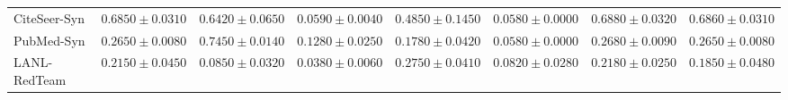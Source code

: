 \documentclass[11pt,a4paper]{article}
\begin{document}
\begin{table}[H]
\begin{tabularx}{\textwidth}{lXXXXXXX}
CiteSeer-Syn & $0.6850 \pm 0.0310$ & $0.6420 \pm 0.0650$ & $0.0590 \pm 0.0040$ & $0.4850 \pm 0.1450$ & $0.0580 \pm 0.0000$ & $\mathbf{0.6880 \pm 0.0320}$ & $0.6860 \pm 0.0310$ \\
PubMed-Syn & $0.2650 \pm 0.0080$ & $\mathbf{0.7450 \pm 0.0140}$ & $0.1280 \pm 0.0250$ & $0.1780 \pm 0.0420$ & $0.0580 \pm 0.0000$ & $0.2680 \pm 0.0090$ & $0.2650 \pm 0.0080$ \\\midrule
LANL-RedTeam & $0.2150 \pm 0.0450$ & $0.0850 \pm 0.0320$ & $0.0380 \pm 0.0060$ & $\mathbf{0.2750 \pm 0.0410}$ & $0.0820 \pm 0.0280$ & $0.2180 \pm 0.0250$ & $0.1850 \pm 0.0480$ \\\bottomrule
\end{tabularx}
\end{table}
\end{document}
